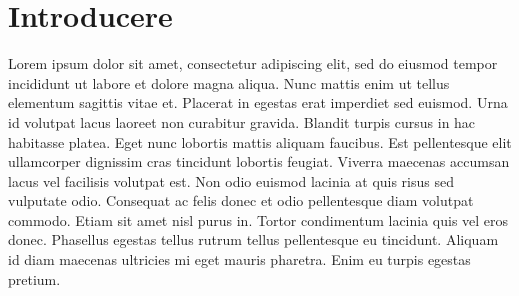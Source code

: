 \chapter*{Introducere} 

Lorem ipsum dolor sit amet, consectetur adipiscing elit, sed do eiusmod tempor incididunt ut labore et dolore magna aliqua. Nunc mattis enim ut tellus elementum sagittis vitae et. Placerat in egestas erat imperdiet sed euismod. Urna id volutpat lacus laoreet non curabitur gravida. Blandit turpis cursus in hac habitasse platea. Eget nunc lobortis mattis aliquam faucibus. Est pellentesque elit ullamcorper dignissim cras tincidunt lobortis feugiat. Viverra maecenas accumsan lacus vel facilisis volutpat est. Non odio euismod lacinia at quis risus sed vulputate odio. Consequat ac felis donec et odio pellentesque diam volutpat commodo. Etiam sit amet nisl purus in. Tortor condimentum lacinia quis vel eros donec. Phasellus egestas tellus rutrum tellus pellentesque eu tincidunt. Aliquam id diam maecenas ultricies mi eget mauris pharetra. Enim eu turpis egestas pretium.